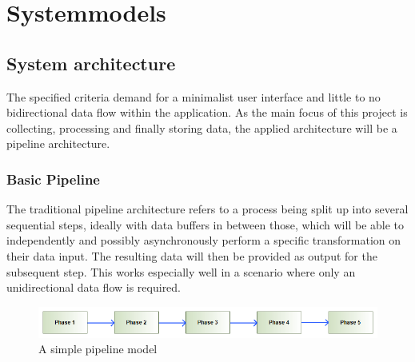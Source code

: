 \chapter{Systemmodels}
\label{ch:sysmodels}

\section{System architecture}
The specified criteria demand for a minimalist user interface and little to no bidirectional data flow within the application. As the main focus of this project is collecting, processing and finally storing data, the applied architecture will be a pipeline architecture.

\subsection{Basic Pipeline}
The traditional pipeline architecture refers to a process being split up into several sequential steps, ideally with data buffers in between those, which will be able to independently and possibly asynchronously perform a specific transformation on their data input. The resulting data will then be provided as output for the subsequent step. This works especially well in a scenario where only an unidirectional data flow is required.
\begin{figure}[h!]
  \includegraphics[width=1.00\textwidth]{resources/simplepipeline.png}
  \centering
  \caption{A simple pipeline model}
  \label{fig:simplepipe}
\end{figure}

